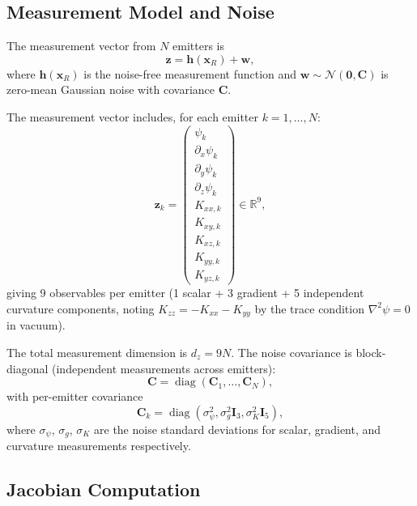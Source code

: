 \documentclass[twocolumn,superscriptaddress,prd,nofootinbib]{revtex4-2}
\newcommand{\xvec}{\mathbf{x}}
\DeclareMathOperator{\diag}{diag}
\begin{document}
\subsection{Measurement Model and Noise}

The measurement vector from $N$ emitters is
\begin{equation}
\mathbf{z} = \mathbf{h}(\xvec_R) + \mathbf{w},
\label{eq:meas-model}
\end{equation}
where $\mathbf{h}(\xvec_R)$ is the noise-free measurement function and
$\mathbf{w} \sim \mathcal{N}(\mathbf{0}, \mathbf{C})$ is zero-mean
Gaussian noise with covariance $\mathbf{C}$.

The measurement vector includes, for each emitter $k = 1,\ldots,N$:
\begin{equation}
\mathbf{z}_k = \begin{pmatrix}
\psi_k \\ \partial_x\psi_k \\ \partial_y\psi_k \\ \partial_z\psi_k \\
K_{xx,k} \\ K_{xy,k} \\ K_{xz,k} \\ K_{yy,k} \\ K_{yz,k}
\end{pmatrix} \in \mathbb{R}^9,
\label{eq:zk}
\end{equation}
giving 9 observables per emitter (1 scalar + 3 gradient + 5 independent
curvature components, noting $K_{zz} = -K_{xx}-K_{yy}$ by the trace
condition $\nabla^2\psi = 0$ in vacuum).

The total measurement dimension is $d_z = 9N$. The noise covariance
is block-diagonal (independent measurements across emitters):
\begin{equation}
\mathbf{C} = \diag(\mathbf{C}_1, \ldots, \mathbf{C}_N),
\end{equation}
with per-emitter covariance
\begin{equation}
\mathbf{C}_k = \diag(\sigma_\psi^2, \sigma_g^2\mathbf{I}_3,
\sigma_K^2\mathbf{I}_5),
\end{equation}
where $\sigma_\psi$, $\sigma_g$, $\sigma_K$ are the noise standard
deviations for scalar, gradient, and curvature measurements respectively.

\subsection{Jacobian Computation}
\end{document}
